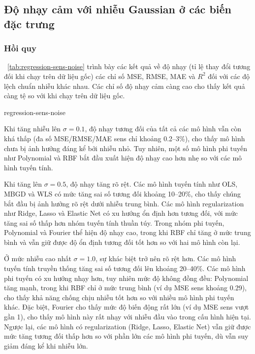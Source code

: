 \subsection{Độ nhạy cảm với nhiễu Gaussian ở các biến đặc trưng}

\subsubsection{Hồi quy}

\tablename~\ref{tab:regression-sens-noise} trình bày các kết quả về độ nhạy (tỉ
lệ thay đổi tương đối khi chạy trên dữ liệu gốc) các chỉ số MSE, RMSE, MAE và
$R^2$ đối với các độ lệch chuẩn nhiễu khác nhau. Các chỉ số độ nhạy cảm càng
cao cho thấy kết quả càng tệ so với khi chạy trên dữ liệu gốc.

{regression-sens-noise}

Khi tăng nhiễu lên $\sigma=0.1$, độ nhạy tương đối của tất cả các mô hình vẫn
còn khá thấp (đa số MSE/RMSE/MAE sens chỉ khoảng 0.2–3\%), cho thấy mô hình
chưa bị ảnh hưởng đáng kể bởi nhiễu nhỏ. Tuy nhiên, một số mô hình phi tuyến
như Polynomial và RBF bắt đầu xuất hiện độ nhạy cao hơn nhẹ so với các mô hình
tuyến tính.

Khi tăng lên $\sigma=0.5$, độ nhạy tăng rõ rệt. Các mô hình tuyến tính như OLS,
MBGD và WLS có mức tăng sai số tương đối khoảng 10–20\%, cho thấy chúng bắt đầu
bị ảnh hưởng rõ rệt dưới nhiễu trung bình. Các mô hình regularization như
Ridge, Lasso và Elastic Net có xu hướng ổn định hơn tương đối, với mức tăng sai
số thấp hơn nhóm tuyến tính thuần túy. Trong nhóm phi tuyến, Polynomial và
Fourier thể hiện độ nhạy cao, trong khi RBF chỉ tăng ở mức trung bình và vẫn
giữ được độ ổn định tương đối tốt hơn so với hai mô hình còn lại.

Ở mức nhiễu cao nhất $\sigma=1.0$, sự khác biệt trở nên rõ rệt hơn. Các mô hình
tuyến tính truyền thống tăng sai số tương đối lên khoảng 20–40\%. Các mô hình
phi tuyến có xu hướng nhạy hơn, tuy nhiên mức độ không đồng đều: Polynomial
tăng mạnh, trong khi RBF chỉ ở mức trung bình (ví dụ MSE sens khoảng 0.29),
cho thấy khả năng chống chịu nhiễu tốt hơn so với nhiều mô hình phi tuyến khác.
Đặc biệt, Fourier cho thấy mức độ biến động rất lớn (ví dụ MSE sens vượt
gần 1), cho thấy mô hình này rất nhạy với nhiễu đầu vào trong cấu hình hiện
tại. Ngược lại, các mô hình có regularization (Ridge, Lasso, Elastic Net) vẫn
giữ được mức tăng tương đối thấp hơn so với phần lớn các mô hình phi tuyến, dù
vẫn suy giảm đáng kể khi nhiễu lớn.

